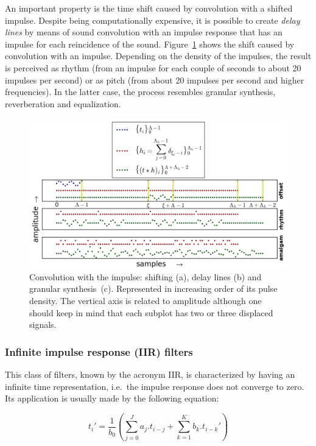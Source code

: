 An important property is the time shift caused by convolution with a shifted impulse. Despite being computationally expensive, it is possible to create \emph{delay lines} by means of sound convolution with an impulse response that has an impulse for each reincidence of the sound. Figure~\ref{fig:delays} shows the shift caused by convolution with an impulse. Depending on the density of the impulses, the result is perceived as rhythm (from an impulse for each couple of seconds to about 20 impulses per second) or as pitch (from about 20 impulses per second and higher frequencies). In the latter case, the process resembles granular synthesis, reverberation and equalization.

\begin{figure}
    \centering
        \includegraphics[width=\textwidth]{figures/delays_}
    \caption{Convolution with the impulse: shifting (a), delay lines (b) and granular synthesis~(c). Represented in increasing order of its pulse density. The vertical axis is related to amplitude although one should keep in mind that each subplot has two or three displaced signals.}
        \label{fig:delays}
\end{figure}

\subsubsection{Infinite impulse response (IIR) filters}
This class of filters, known by the acronym IIR, is characterized by having an infinite time representation, i.e.\ the impulse response does not converge to zero. Its application is usually made by the following equation:

\begin{equation}\label{eq:diferencas}
 t_i' = \frac{1}{b_0}\left ( \sum_{j=0}^Ja_j . t_{i-j} + \sum_{k=1}^Kb_k . t_{i-k}' \right )
\end{equation}

